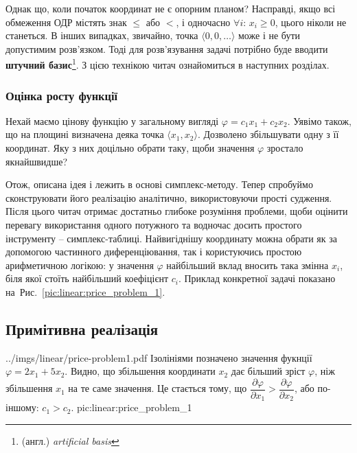 \documentclass[\main/book.tex]{subfiles}
\begin{document}
Однак що, коли початок координат не є опорним планом? Насправді, якщо всі обмеження ОДР містять знак \flqq{}$\leq$\frqq{} або \flqq{}$<$\frqq{}, і одночасно ${\forall i:}\, {x_i \geq 0}$, цього ніколи не станеться. В інших випадках, звичайно, точка ${\langle 0, 0, \ldots \rangle}$ може і не бути допустимим розв'язком. Тоді для розв'язування задачі потрібно буде вводити \textbf{штучний базис}\footnote{(англ.) \textit{artificial basis}}. З цією технікою читач ознайомиться в наступних розділах.
\subsubsection{Оцінка росту функції}
\label{section:linear:phi_increase_evaluation}

Нехай маємо цінову функцію у загальному вигляді $\varphi = c_1 x_1 + c_2 x_2$. Уявімо також, що на площині визначена деяка точка ${\langle x_1, x_2 \rangle}$. Дозволено збільшувати одну з її координат. Яку з них доцільно обрати таку, щоби значення $\varphi$ зростало якнайшвидше?

Отож, описана ідея і лежить в основі симплекс-методу. Тепер спробуймо сконструювати його реалізацію аналітично, використовуючи прості судження. Після цього читач отримає достатньо глибоке розуміння проблеми, щоби оцінити перевагу використання одного потужного та водночас досить простого інструменту -- симплекс-таблиці.
\flqq{}Найвигіднішу\frqq{} координату можна обрати як за допомогою частинного диференціювання, так і користуючись простою арифметичною логікою: у значення $\varphi$ найбільший вклад вносить така змінна $x_i$, біля якої стоїть найбільший коефіцієнт $c_i$. Приклад конкретної задачі показано на~Рис.~\ref{pic:linear:price_problem_1}.

\subsection{Примітивна реалізація}

\illustration
 {../imgs/linear/price-problem1.pdf}
 {Ізолініями позначено значення фукнції $\varphi = 2 x_1 + 5 x_2$. Видно, що збільшення координати $x_2$ дає більший зріст $\varphi$, ніж збільшення $x_1$ на те саме значення. Це стається тому, що $\dfrac{\partial\varphi}{\partial x_1} > \dfrac{\partial\varphi}{\partial x_2}$, або по-іншому: $c_1 > c_2$.}
 {pic:linear:price_problem_1}
\end{document}
